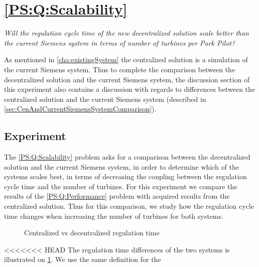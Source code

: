 \section{\ref{PS:Q:Scalability}}

\textit{Will the regulation cycle time of the new decentralized solution scale better than the current Siemens system in terms of number of turbines per Park Pilot?}\newline\newline

\noindent As mentioned in \cref{cha:existingSystem} the centralized solution is a simulation of the current Siemens system. Thus to complete the comparison between the decentralized solution and the current Siemens system, the discussion section of this experiment also contains a discussion with regards to differences between the centralized solution and the current Siemens system (described in \cref{sec:CenAndCurrentSiemensSystemComparison}).

\subsection{Experiment}
\label{subsec:Exper:Scale}

The \ref{PS:Q:Scalability} problem asks for a comparison between the decentralized solution and the current Siemens system, in order to determine which of the systems scales best, in terms of decreasing the coupling between the regulation cycle time and the number of turbines. For this experiment we compare the results of the \ref{PS:Q:Performance} problem with acquired results from the centralized solution. Thus for this comparison, we study how the regulation cycle time changes when increasing the number of turbines for both systems.


\begin{figure}[b]
	\centering
	{}
	\newline
	
	\newline
	
	{}
	
	\caption{Centralized vs decentralized regulation time}
	\label{fig:timingCentralVSDecentral}
\end{figure}

<<<<<<< HEAD
The regulation time differences of the two systems is illustrated on \cref{fig:timingCentralVSDecentral}. We use the same definition for the 

